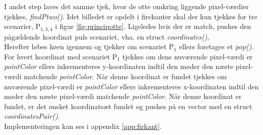 I andet step laves det samme tjek, hvor de otte omkring liggende pixel-værdier tjekkes, \emph{findPtwo()}. Idet billedet er opdelt i firekanter skal der kun tjekkes for tre scenarier, P\(_{1, 3, 4}\) i figur \ref{fig:principotte}. Ligeledes hvis der er match, pushes den pågældende koordinat puls scenariet, vha. en struct \emph{coordinates()},\\
Herefter løbes køen igennem og tjekker om scenariet P\(_{1}\) ellers foretages et \emph{pop()}. For hvert koordinat med scenariet P\(_{1}\) tjekkes om dens nuværende pixel-værdi er \emph{pointColor} ellers inkrementeres y-koordinaten indtil den møder den næste pixel-værdi matchende \emph{pointColor}. Når denne koordinat er fundet tjekkes om nuværende pixel-værdi er \emph{pointColor} ellers inkrementeres x-koordinaten indtil den møder den næste pixel-værdi matchende \emph{pointColor}. Når denne koordinat er fundet, er det ønsket koordinatsæt fundet og pushes på en vector med en struct \emph{coordinatesPair()}.\\
Implementeringen kan ses i appendix \ref{app:firkant}. 

